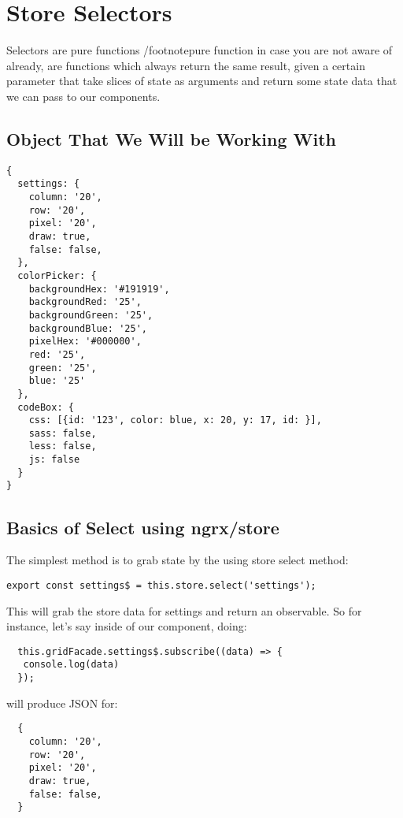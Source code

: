 \maketitle{}
\section{ Store Selectors }

Selectors are pure functions /footnote{pure function in case you are not aware
of already, are functions which always return the same result, given a certain
parameter} that take slices of state as arguments and return some state data
that we can pass to our components.


\subsection{Object That We Will be Working With}
\begin{verbatim}
{
  settings: {
    column: '20',
    row: '20',
    pixel: '20',
    draw: true,
    false: false,
  },
  colorPicker: {
    backgroundHex: '#191919',
    backgroundRed: '25',
    backgroundGreen: '25',
    backgroundBlue: '25',
    pixelHex: '#000000',
    red: '25',
    green: '25',
    blue: '25'
  },
  codeBox: {
    css: [{id: '123', color: blue, x: 20, y: 17, id: }],
    sass: false,
    less: false,
    js: false
  }
}
\end{verbatim}

\subsection{Basics of Select using ngrx/store}

The simplest method is to grab state by the using store select method:
\begin{lstlisting}
export const settings$ = this.store.select('settings');
\end{lstlisting}

This will grab the store data for settings and return an observable. So for
instance, let's say inside of our component, doing:
\begin{lstlisting}
  this.gridFacade.settings$.subscribe((data) => {
   console.log(data)
  });
\end{lstlisting}
 will produce JSON for:
\begin{verbatim}
  {
    column: '20',
    row: '20',
    pixel: '20',
    draw: true,
    false: false,
  }
\end{verbatim}


